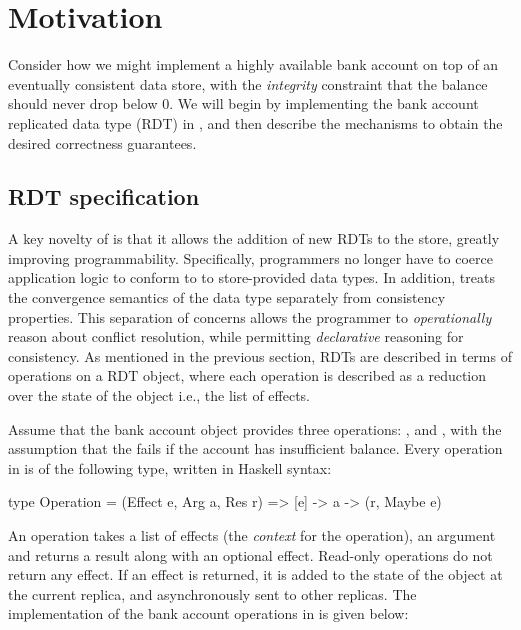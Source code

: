 \section{Motivation}
\label{sec:motivation}

Consider how we might implement a highly available bank account on top of an
eventually consistent data store, with the \emph{integrity} constraint that the
balance should never drop below 0. We will begin by implementing the bank
account replicated data type (RDT) in \name, and then describe the mechanisms
to obtain the desired correctness guarantees.

\subsection{RDT specification}

A key novelty of \name is that it allows the addition of new RDTs to the
store, greatly improving programmability.  Specifically, programmers no
longer have to coerce application logic to conform to to store-provided data
types. In addition, \name treats the convergence semantics of the data type
separately from consistency properties. This separation of concerns allows
the programmer to \emph{operationally} reason about conflict resolution,
while permitting \emph{declarative} reasoning for consistency. As mentioned
in the previous section, RDTs are described in terms of operations on a RDT
object, where each operation is described as a reduction over the state of
the object i.e., the list of effects.

Assume that the bank account object provides three operations: ,
 and , with the assumption that the 
fails if the account has insufficient balance.  Every operation in \name is
of the following type, written in Haskell syntax:

\begin{codehaskell}
type Operation = (Effect e, Arg a, Res r)
               => [e] -> a -> (r, Maybe e)
\end{codehaskell}

\noindent An operation takes a list of effects (the \emph{context} for the operation), an
argument and returns a result along with an optional effect. Read-only
operations do not return any effect. If an effect is returned, it is added to
the state of the object at the current replica, and asynchronously sent to
other replicas. The implementation of the bank account operations in \name is
given below:

